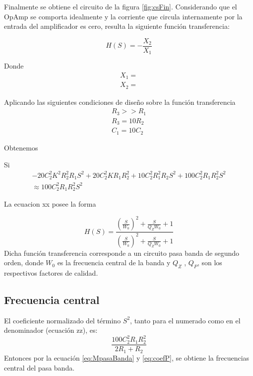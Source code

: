\documentclass[../../tc_tp3_main.tex]{subfiles}
\begin{document}
Finalmente se obtiene el circuito de la figura \ref{fig:csFin}. Considerando que el OpAmp se comporta idealmente y la corriente que circula internamente por la entrada del amplificador es cero, resulta la siguiente  función transferencia:

\begin{equation}
H(S)=- \frac{X_2}{X_1}\label{eq:circuitoRed}
\end{equation}

Donde
\begin{gather}
X_1=    \\
X_2=
\end{gather}

Aplicando las siguientes condiciones de diseño sobre la función transferencia
\begin{gather}
 R_3 >> R_1   \\
 R_3 =10 R_2   \\
C_1=10C_2
\end{gather}

Obtenemos


Si
\begin{equation}
\begin{split}
-20C_{2}^2 K^2 R_{2}^2 R_{1}  S^{2} +    20 C_{2}^{2} K R_{1} R_{2}^2+ 10 C_{2}^2 R_{1}^2 R_{2} S^{2} + 100 C_{2}^{2} R_{1} R_{2}^2 S^{2}  \\   \approx 100 C_{2}^2 R_{1} R_{2} ^2 S^2
\end{split}
\end{equation}




La ecuacion xx posee la forma

\begin{equation}
H(S)=\frac {\left( \frac{S}{W_0} \right) ^2 + \frac{S}{Q_Z W_0} +1}{\left( \frac{S}{W_0} \right) ^2 +\frac{S}{Q_Z W_0}+1} \label{eq:MpasaBanda}
\end{equation}
Dicha función transferencia corresponde a un circuito pasa banda de segundo orden, donde $W_0$ es la frecuencia central de la banda y $Q_Z$ , $Q_P$, son los respectivos factores de calidad.
\subsection{Frecuencia central}
El coeficiente normalizado del término $S^2$, tanto para el numerado como en el denominador (ecuación zz), es:
\begin{equation}
\frac{100 C_{2}^2 R_{1} R_{2} ^2}{2R_1+R_2}  \label{eq:coefP}
\end{equation}
Entonces por la ecuación \ref{eq:MpasaBanda} y \ref{eq:coefP}, se obtiene la frecuencias central del pasa banda.
\end{document}
